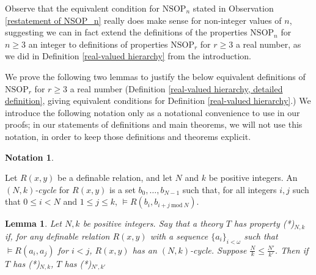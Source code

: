 \documentclass{amsart}
\newtheorem{lemma}[theorem]{Lemma}
\theoremstyle{definition}
\newtheorem{notation}[theorem]{Notation}
\theoremstyle{remark}
\numberwithin{equation}{section}
\begin{document}
Observe that the equivalent condition for $\mathrm{NSOP}_{n}$ stated in Observation \ref{restatement of NSOP_n} really does make sense for non-integer values of $n$, suggesting we can in fact extend the definitions of the properties $\mathrm{NSOP}_{n}$ for $n \geq 3$ an integer to definitions of properties $\mathrm{NSOP}_{r}$ for $r \geq 3$ a real number, as we did in Definition \ref{real-valued hierarchy} from the introduction. 

We prove the following two lemmas to justify the below equivalent definitions of $\mathrm{NSOP}_{r}$ for $r \geq 3$ a real number (Definition \ref{real-valued hierarchy, detailed definition}, giving equivalent conditions for Definition \ref{real-valued hierarchy}.) We introduce the following notation only as a notational convenience to use in our proofs; in our statements of definitions and main theorems, we will not use this notation, in order to keep those definitions and theorems explicit.

\begin{notation}\label{(N, k)-cycle}

Let $R(x, y)$ be a definable relation, and let $N$ and $k$ be positive integers. An \textit{$(N, k)$-cycle} for $R(x, y)$ is a set  $b_{0}, \ldots, b_{N -1} $ such that, for all integers $i, j$ such that $0 \leq i <N$ and $1 \leq j \leq k $,  $\models R(b_{i}, b_{i+j \mathrm{\: mod \:} N})$.
\end{notation}

\begin{lemma}\label{(N, k)-cycle comparison}
    Let $N, k$ be positive integers. Say that a theory $T$ has property \emph{(*)}$_{N, k}$ if, for any definable relation $R(x, y)$ with a sequence $\{a_{i}\}_{i < \omega}$ such that $\models R(a_{i}, a_{j})$ for $i <j$, $R(x, y)$ has an $(N, k)$-cycle. Suppose $\frac{N}{k} \leq \frac{N'}{k'}$. Then if $T$ has \emph{(*)}$_{N, k}$, $T$ has \emph{(*)}$_{N', k'}$ 
\end{lemma}
\end{document}
